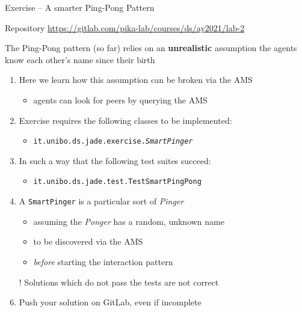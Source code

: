 \documentclass{beamer}\mode<presentation>{\usetheme{AMSCesenaPurpleAndGold}}
\begin{document}
\begin{frame}[c,allowframebreaks]{Exercise \currentExercise{} -- A smarter Ping-Pong Pattern}
	
	\begin{block}{Repository}\centering
		\url{https://gitlab.com/pika-lab/courses/ds/ay2021/lab-2}
	\end{block}
	
	\bigskip
	
	\begin{alertblock}{The Ping-Pong pattern (so far) relies on an \textbf{unrealistic} assumption}
		\centering
		the agents know each other's name since their birth
	\end{alertblock}
	\medskip
	\begin{enumerate}
		
		\item Here we learn how this assumption can be broken via the AMS
		\begin{itemize}
			\item \jade{} agents can \alert{look for} peers by querying the AMS
		\end{itemize} 
		
		\medskip
		
		\item Exercise \currentExercise{} requires the following classes to be implemented:
		\begin{itemize}
			\item \texttt{it.unibo.ds.jade.\alert{exercise.\textit{SmartPinger}}}
		\end{itemize}
		
		\framebreak
		
		\item In such a way that the following test suites succeed:
		\begin{itemize}
			\item \texttt{it.unibo.ds.jade.test.\alert{TestSmartPingPong}}
		\end{itemize}
	
		\medskip
		
		\item A \texttt{SmartPinger} is a particular sort of \textit{Pinger} 
		\begin{itemize}
			\item assuming the \textit{Ponger} has a random, unknown name
			\item to be discovered via the AMS
			\item \emph{before} starting the interaction pattern
		\end{itemize}
		
		\medskip
		
		\item[!] Solutions which do not pass the tests are not correct
		
		\medskip
		
		\item Push your solution on GitLab, \alert{even if incomplete}
		
	\end{enumerate}
	
\end{frame}
\end{document}

